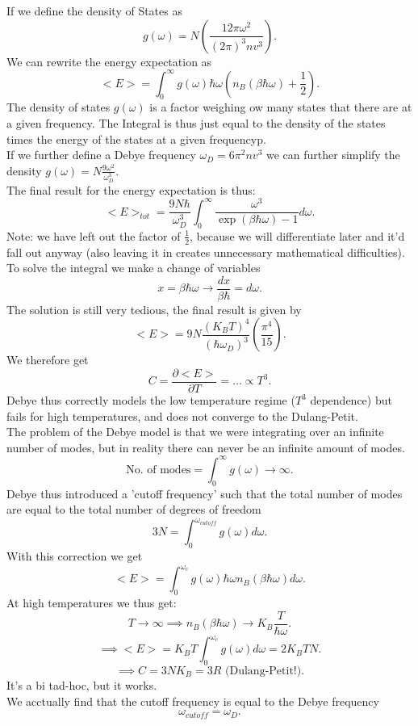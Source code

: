 \documentclass{report}
\begin{document}
 If we define the density of States as \[
	 g(\omega) = N \left( \frac{12 \pi \omega^2}{\left( 2 \pi \right) ^3 n v^3} \right) 
 .\] We can rewrite the energy expectation as \[
 <E> = \int_0^{\infty} g(\omega) \hbar \omega \left( n_B(\beta \hbar \omega) + \frac{1}{2} \right) 
 .\] The density of states $g(\omega)$ is a factor weighing ow many states that there are at a given frequency. The Integral is thus just equal to the density of the states times the energy of the states at a given frequencyp.\\
 If we further define a Debye frequency $\omega_D = 6 \pi^2 n v^3$ we can further simplify the density $g(\omega) = N \frac{9 \omega^2}{\omega_D^3}$. \\
 The final result for the energy expectation is thus: \[
	 <E>_{tot} = \frac{9 N \hbar}{\omega_D^3} \int_0^{\infty} \frac{\omega^3}{\exp\left( \beta \hbar \omega \right) - 1} d\omega
 .\] Note: we have left out the factor of $\frac{1}{2}$, because we will differentiate later and it'd fall out anyway (also leaving it in creates unnecessary mathematical difficulties).\\
 To solve the integral we make a change of variables \[
 x = \beta \hbar \omega \to \frac{dx}{\beta \hbar} = d\omega
 .\] The solution is still very tedious, the final result is given by \[
 <E> = 9N \frac{(K_BT)^4}{(\hbar \omega_D)^3} \left( \frac{\pi^4}{15} \right) 
 .\] We therefore get \[
 C = \frac{\partial <E>}{\partial T} = \ldots \propto T^3
 .\] Debye thus correctly models the low temperature regime ($T^3$ dependence) but fails for high temperatures, and does not converge to the Dulang-Petit. \\
 The problem of the Debye model is that we were integrating over an infinite number of modes, but in reality there can never be an infinite amount of modes. \[
	 \text{No. of modes} = \int_0^{\infty} g(\omega) \to \infty
 .\] Debye thus introduced a 'cutoff frequency' such that the total number of modes are equal to the total number of degrees of freedom \[
 3N = \int_0^{\omega_{cutoff}} g(\omega)d\omega
 .\] With this correction we get \[
 <E> = \int_0^{\omega_c} g(\omega) \hbar \omega n_B(\beta \hbar \omega) d\omega
 .\] At high temperatures we thus get: \[
 T \to \infty \implies n_B(\beta \hbar \omega) \to K_B \frac{T}{\hbar \omega}
 .\] \[
 \implies <E> = K_B T \int_0^{\omega_c} g(\omega) d\omega = 2 K_B T N 
 .\] \[
 \implies C = 3NK_B = 3R \text{ (Dulang-Petit!)}
 .\] It's a bi tad-hoc, but it works.\\
 We acctually find that the cutoff frequency is equal to the Debye frequency \[
	 \omega_{cutoff} = \omega_D
 .\] 
\end{document}
